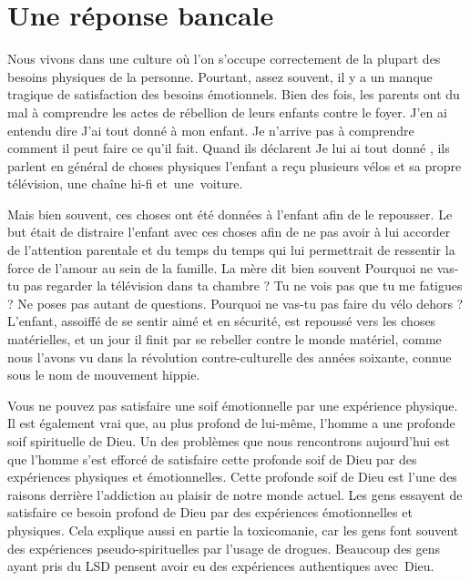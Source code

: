 \section{Une r\'eponse bancale}

Nous vivons dans une culture où l'on s'occupe correctement de la plupart
 des besoins physiques de la personne. Pourtant, assez souvent,
 il y a un manque tragique de satisfaction des besoins émotionnels.
 Bien des fois, les parents ont du mal à comprendre les actes de rébellion
 de leurs enfants contre le foyer. J'en ai entendu dire\frcolon{}
 \Og J'ai tout donné à mon enfant. Je n'arrive pas à comprendre
 comment il peut faire ce qu'il fait. \Fg{}
 Quand ils déclarent\frcolon{} \Og Je lui ai tout donné \Fg{}, ils parlent en général
 de choses physiques\frcolon{} l'enfant a reçu plusieurs vélos
 et sa propre télévision, une chaîne hi-fi et~une~voiture.
 \nowidow[6]

Mais bien souvent, ces choses ont été données à l'enfant afin de le repousser.
 Le but était de distraire l'enfant avec ces choses afin de ne pas avoir
 à lui accorder de l'attention parentale et du temps
 \ocadr du temps qui lui permettrait de ressentir la force
 de l'amour au sein de la famille. La mère dit bien souvent\frcolon{}
 \Og Pourquoi ne vas-tu pas regarder la télévision dans ta chambre ?
 Tu ne vois pas que tu me fatigues ? Ne poses pas autant de questions.
 Pourquoi ne vas-tu pas faire du vélo dehors ? \Fg{}
 L'enfant, assoiffé de se sentir aimé et en sécurité,
 est repoussé vers les choses matérielles, et un jour il finit
 par se rebeller contre le monde matériel, comme nous l'avons vu
 dans la révolution contre-culturelle des années soixante, connue sous le nom de mouvement hippie.


Vous ne pouvez pas satisfaire une soif émotionnelle par une
 expérience physique. Il est également vrai que, au plus profond de lui-même,
 l'homme a une profonde soif spirituelle de Dieu.
 Un des problèmes que nous rencontrons aujourd'hui est que l'homme
 s'est efforcé de satisfaire cette profonde soif de Dieu
 par des expériences physiques et émotionnelles.
 Cette profonde soif de Dieu est l'une des raisons derrière l'addiction
 au plaisir de notre monde actuel. Les gens essayent de satisfaire
 ce besoin profond de Dieu par des expériences émotionnelles et physiques.
 Cela explique aussi en partie la toxicomanie,
 car les gens font souvent des expériences pseudo-spirituelles
 par l'usage de drogues. Beaucoup des gens ayant pris du LSD
 pensent avoir eu des expériences authentiques avec~Dieu.


